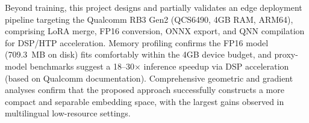 \documentclass[../main.tex]{subfiles}
\begin{document}
\noindent Beyond training, this project designs and partially validates an edge deployment pipeline targeting the Qualcomm RB3 Gen2 (QCS6490, 4GB RAM, ARM64), comprising LoRA merge, FP16 conversion, ONNX export, and QNN compilation for DSP/HTP acceleration. Memory profiling confirms the FP16 model (709.3~MB on disk) fits comfortably within the 4GB device budget, and proxy-model benchmarks suggest a 18--30$\times$ inference speedup via DSP acceleration (based on Qualcomm documentation). Comprehensive geometric and gradient analyses confirm that the proposed approach successfully constructs a more compact and separable embedding space, with the largest gains observed in multilingual low-resource settings.

\vspace{2cm}

\begin{flushright}
    \begin{tabular}{l}
    \end{tabular}
\end{flushright}
\end{document}
